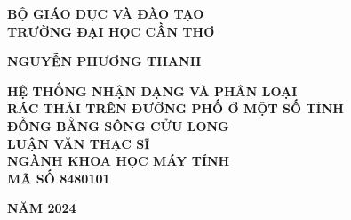 \documentclass[../the.tex]{subfiles}
\begin{document}
\begin{titlepage}

\begin{center}
\thispagestyle{empty}
{\fontsize{14}{14}\selectfont \textbf{BỘ GIÁO DỤC VÀ ĐÀO TẠO}\\
\textbf{TRƯỜNG ĐẠI HỌC CẦN THƠ}\\[3cm]
}

{\fontsize{14}{14}\selectfont \textbf{NGUYỄN PHƯƠNG THANH}
}\\[3cm]



\begin{large}
\end{large}
{\fontsize{20}{12}\selectfont
\textbf{{HỆ THỐNG NHẬN DẠNG VÀ PHÂN LOẠI
 \\ RÁC THẢI TRÊN ĐƯỜNG PHỐ Ở MỘT SỐ TỈNH \\ ĐỒNG BẰNG SÔNG CỬU LONG
}}}
\\[4cm]

{\fontsize{14}{14}\selectfont \textbf{LUẬN VĂN THẠC SĨ}\\
\textbf{NGÀNH KHOA HỌC MÁY TÍNH\\MÃ SỐ 8480101\\[6cm]}
}

{\fontsize{14}{12}\selectfont
\textbf{NĂM 2024}}

\end{center}

\end{titlepage}
\end{document}
